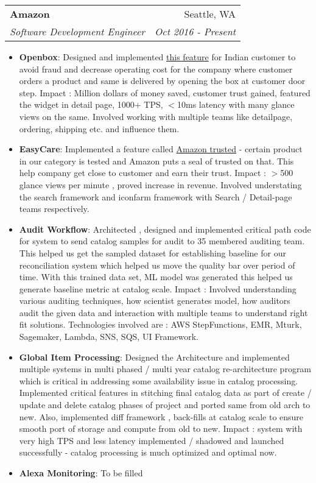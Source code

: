 \documentclass[letterpaper,11pt]{article}
\makeatletter
\newcommand{\resumeItem}[2]{
  \item\small{
    \textbf{#1}{: #2 \vspace{-2pt}}
  }
}
\newcommand{\resumeSubheading}[4]{
  \vspace{-1pt}\item
    \begin{tabular*}{0.97\textwidth}{l@{\extracolsep{\fill}}r}
      \textbf{#1} & #2 \\
      \textit{\small#3} & \textit{\small #4} \\
    \end{tabular*}\vspace{-5pt}
}
\newcommand{\resumeItemListStart}{\begin{itemize}}
\newcommand{\resumeItemListEnd}{\end{itemize}\vspace{-5pt}}
\makeatother
\begin{document}
    \resumeSubheading
      {Amazon}{Seattle, WA}
      {Software Development Engineer}{Oct 2016 - Present}
      \resumeItemListStart
        \resumeItem{Openbox}
          {Designed and implemented \href{https://www.amazon.in/gp/help/customer/display.html/ref=dp_openbox_read_more_desktop_en_in?ie=UTF8&pop-up=1&nodeId=GNHMSYW5BTFBTMEW}{this feature} for Indian customer to avoid fraud and decrease operating cost for the company where customer orders a product and same is delivered by opening the box at customer door step. Impact : Million dollars of money saved, customer trust gained, featured the widget in detail page, 1000+ TPS, $<$10ms latency with many glance views on the same. Involved working with multiple teams like detailpage, ordering, shipping etc. and influence them.}
        \resumeItem{EasyCare}
          {Implemented a feature called \href{https://www.amazon.in/amazontrusted}{Amazon trusted} - certain product in our category is tested and Amazon puts a seal of trusted on that. This help company get close to customer and earn their trust. Impact : $>$500 glance views per minute , proved increase in revenue. Involved understating the search framework and iconfarm framework with Search / Detail-page teams respectively.}
        \resumeItem{Audit Workflow}
          {Architected , designed and implemented critical path code for system to send catalog samples for audit to 35 membered auditing team. This helped us get the sampled dataset for establishing baseline for our reconciliation system which helped us move the quality bar over period of time. With this trained data set, ML model was generated this helped us generate baseline metric at catalog scale. Impact : Involved understanding various auditing techniques, how scientist generates model, how auditors audit the given data and interaction with multiple teams to understand right fit solutions. Technologies involved are : AWS StepFunctions, EMR, Mturk, Sagemaker, Lambda, SNS, SQS, UI Framework.}
        \resumeItem{Global Item Processing}
          {Designed the Architecture and implemented multiple systems in multi phased / multi year catalog re-architecture program which is critical in addressing some availability issue in catalog processing. Implemented critical features in stitching final catalog data as part of create / update and delete catalog phases of project and ported same from old arch to new. Also, implemented diff framework , back-fills at catalog scale to ensure smooth port of storage and compute from old to new. Impact : system with very high TPS and less latency implemented / shadowed and launched successfully - catalog processing is much optimized and optimal now.}
         \resumeItem{Alexa Monitoring}
          {To be filled}
      \resumeItemListEnd
\end{document}
